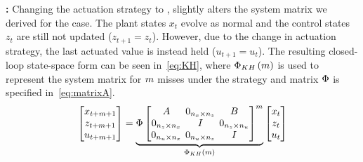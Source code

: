 \textbf{\tKH{}: }%
%
Changing the actuation strategy to \tH{}, slightly alters the system matrix we derived for the \tKZ{} case.
The plant states $x_t$ evolve as normal and the control states $z_t$ are still not updated ($z_{t+1} = z_t$).
However, due to the change in actuation strategy, the last actuated value is instead held ($u_{t+1} = u_t$).
The resulting closed-loop state-space form can be seen in~\eqref{eq:KH}, where $\Phi{}_{KH}\left( m \right)$ is used to represent the system matrix for $m$ misses under the \tKH{} strategy and matrix $\Phi{}$ is specified in~\eqref{eq:matrixA}.
%
\begin{equation}
    \setlength\arraycolsep{2pt}
    \label{eq:KH}
    \begin{bmatrix}
        x_{t+\nummisses+1} \\
        z_{t+\nummisses+1} \\
        u_{t+\nummisses+1}
    \end{bmatrix} = 
    \underbrace{ \clmat{} \begin{bmatrix}
        \Ap                                         & 0_{n_x \times n_z}  & \Bp \\
        0_{n_z \times n_x}    & I                                         & 0_{n_z \times n_u} \\
        0_{n_u \times n_x}   & 0_{n_u \times n_z}   & I
    \end{bmatrix}^{\nummisses}}_{\clmat{}_{KH}\funof{\nummisses}}
    \begin{bmatrix}
        x_{t} \\
        z_{t} \\
        u_{t}
    \end{bmatrix}
\end{equation}

